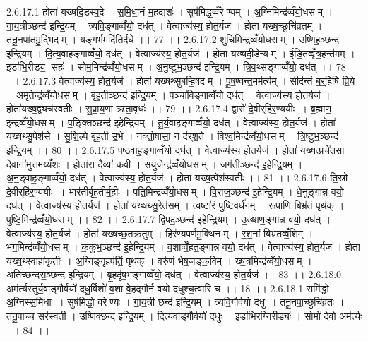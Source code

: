 2.6.17.1
होता॑ यख्षदि॒डस्प॒दे । स॒मि॒धा॒नं म॒हद्यशः॑ । सुष॑मिद्ध॒व्वँरेण्यम् । अ॒ग्निमिन्द्र॑व्वँयो॒धसम् । गा॒य॒त्रीञ्छन्द॑ इन्द्रि॒यम् । त्र्यवि॒ङ्गाव्वँयो॒ दध॑त् । वेत्वाज्य॑स्य॒ होत॒र्यज॑ । होता॑ यख्ष॒च्छुचि॑व्रतम् । तनू॒नपा॑तमु॒द्भिदम् । यङ्गर्भ॒मदि॑तिर्द॒धे ।। 77 ।।
2.6.17.2
शुचि॒मिन्द्र॑व्वँयो॒धसम् । उ॒ष्णिह॒ञ्छन्द॑ इन्द्रि॒यम् । दि॒त्य॒वाह॒ङ्गाव्वँयो॒ दध॑त् । वेत्वाज्य॑स्य॒ होत॒र्यज॑ । होता॑ यख्षदी॒डेन्यम् । ई॒डि॒तव्वृँ॑त्र॒हन्त॑मम् । इडा॑भि॒रीड्य॒॒ सहः॑ । सोम॒मिन्द्र॑व्वँयो॒धसम् । अ॒नु॒ष्टुभ॒ञ्छन्द॑ इन्द्रि॒यम् । त्रि॒व॒थ्सङ्गाव्वँयो॒ दध॑त् ।। 78 ।।
2.6.17.3
वेत्वाज्य॑स्य॒ होत॒र्यज॑ । होता॑ यख्षथ्सुबऱ्हि॒षदम् । पू॒ष॒ण्वन्त॒मम॑र्त्यम् । सीद॑न्तं ब॒र्॒हिषि॑ प्रि॒ये । अ॒मृतेन्द्र॑व्वँयो॒धसम् । बृ॒ह॒तीञ्छन्द॑ इन्द्रि॒यम् । पञ्चा॑वि॒ङ्गाव्वँयो॒ दध॑त् । वेत्वाज्य॑स्य॒ होत॒र्यज॑ । होता॑यख्ष॒द्व्यच॑स्वतीः । सु॒प्रा॒य॒णा ऋ॑ता॒वृधः॑ ।। 79 ।।
2.6.17.4
द्वारो॑ दे॒वीर्‌हि॑र॒ण्ययीः । ब्र॒ह्माण॒ इन्द्र॑व्वँयो॒धसम् । प॒ङ्क्तिञ्छन्द॑ इ॒हेन्द्रि॒यम् । तु॒र्य॒वाह॒ङ्गाव्वँयो॒ दध॑त् । वेत्वाज्य॑स्य॒ होत॒र्यज॑ । होता॑ यख्षथ्सु॒पेश॑से । सु॒शि॒ल्पे बृ॑ह॒ती उ॒भे । नक्तो॒षासा॒ न द॑र्‌श॒ते । विश्व॒मिन्द्र॑व्वँयो॒धसम् । त्रि॒ष्टुभ॒ञ्छन्द॑ इन्द्रि॒यम् ।। 80 ।।
2.6.17.5
प॒ष्ठ॒वाह॒ङ्गाव्वँयो॒ दध॑त् । वेत्वाज्य॑स्य॒ होत॒र्यज॑ । होता॑ यख्ष॒त्प्रचे॑तसा । दे॒वाना॑मुत्त॒मय्यँशः॑ । होता॑रा॒ दैव्या॑ क॒वी । स॒युजेन्द्र॑व्वँयो॒धसम् । जग॑ती॒ञ्छन्द॑ इ॒हेन्द्रि॒यम् । अ॒न॒ड्वाह॒ङ्गाव्वँयो॒ दध॑त् । वेत्वाज्य॑स्य॒ होत॒र्यज॑ । होता॑ यख्ष॒त्पेश॑स्वतीः ।। 81 ।।
2.6.17.6
ति॒स्रो दे॒वीर्‌हि॑र॒ण्ययीः । भार॑तीर्बृह॒तीर्म॒हीः । पति॒मिन्द्र॑व्वँयो॒धसम् । वि॒राज॒ञ्छन्द॑ इ॒हेन्द्रि॒यम् । धे॒नुङ्गान्न वयो॒ दध॑त् । वेत्वाज्य॑स्य॒ होत॒र्यज॑ । होता॑ यख्षथ्सु॒रेत॑सम् । त्वष्टा॑रं पुष्टि॒वर्ध॑नम् । रू॒पाणि॒ बिभ्र॑तं॒ पृथ॑क् । पुष्टि॒मिन्द्र॑व्वँयो॒धसम् ।। 82 ।।
2.6.17.7
द्वि॒पद॒ञ्छन्द॑ इ॒हेन्द्रि॒यम् । उ॒ख्षाण॒ङ्गान्न वयो॒ दध॑त् । वेत्वाज्य॑स्य॒ होत॒र्यज॑ । होता॑ यख्षच्छ॒तक्र॑तुम् । हिर॑ण्यपर्णमु॒क्थिनम् । र॒श॒नां बिभ्र॑तव्वँ॒शिम् । भग॒मिन्द्र॑व्वँयो॒धसम् । क॒कुभ॒ञ्छन्द॑ इ॒हेन्द्रि॒यम् । व॒शाव्वेँ॒हत॒ङ्गान्न वयो॒ दध॑त् । वेत्वाज्य॑स्य॒ होत॒र्यज॑ । होता॑ यख्ष॒थ्स्वाहा॑कृतीः । अ॒ग्निङ्गृ॒हप॑तिं॒ पृथ॑क् । वरु॑णं भेष॒जङ्क॒विम् । ख्ष॒त्रमिन्द्र॑व्वँयो॒धसम् । अति॑च्छन्दस॒ञ्छन्द॑ इन्द्रि॒यम् । बृ॒हदृ॑ष॒भङ्गाव्वँयो॒ दध॑त् । वेत्वाज्य॑स्य॒ होत॒र्यज॑ ।। 83 ।।
2.6.18.0
अम॑र्त्यस्तुर्य॒वाड्गौर्वयो॑ दधु॒र्विशो॑ व॒शा वे॒हद्गौर्न वयो॑ दधुश्च॒त्वारि॑ च ।। 18 ।।
2.6.18.1
समि॑द्धो अ॒ग्निस्स॒मिधा । सुष॑मिद्धो॒ वरेण्यः । गा॒य॒त्री छन्द॑ इन्द्रि॒यम् । त्र्यवि॒र्गौर्वयो॑ दधुः । तनू॒नपा॒च्छुचि॑व्रतः । त॒नू॒पाच्च॒ सर॑स्वती । उ॒ष्णिक्छन्द॑ इन्द्रि॒यम् । दि॒त्य॒वाड्गौर्वयो॑ दधुः । इडा॑भिर॒ग्निरीड्यः॑ । सोमो॑ दे॒वो अम॑र्त्यः ।। 84 ।।
